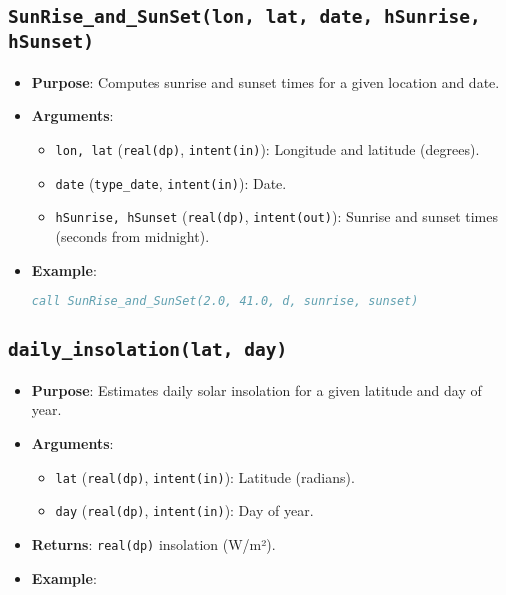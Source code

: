 \documentclass[12pt,a4paper]{report}
\begin{document}
\subsection{\texttt{SunRise\_and\_SunSet(lon, lat, date, hSunrise, hSunset)}}
\begin{itemize}
\item \textbf{Purpose}: Computes sunrise and sunset times for a given location and date.
\item \textbf{Arguments}:
\begin{itemize}
\item \texttt{lon, lat} (\texttt{real(dp)}, \texttt{intent(in)}): Longitude and latitude (degrees).
\item \texttt{date} (\texttt{type\_date}, \texttt{intent(in)}): Date.
\item \texttt{hSunrise, hSunset} (\texttt{real(dp)}, \texttt{intent(out)}): Sunrise and sunset times (seconds from midnight).
\end{itemize}
\item \textbf{Example}:
\begin{lstlisting}[language=Fortran]
call SunRise_and_SunSet(2.0, 41.0, d, sunrise, sunset)
\end{lstlisting}
\end{itemize}

\subsection{\texttt{daily\_insolation(lat, day)}}
\begin{itemize}
\item \textbf{Purpose}: Estimates daily solar insolation for a given latitude and day of year.
\item \textbf{Arguments}:
\begin{itemize}
\item \texttt{lat} (\texttt{real(dp)}, \texttt{intent(in)}): Latitude (radians).
\item \texttt{day} (\texttt{real(dp)}, \texttt{intent(in)}): Day of year.
\end{itemize}
\item \textbf{Returns}: \texttt{real(dp)} insolation (W/m²).
\item \textbf{Example}:
\end{itemize}
\end{document}
